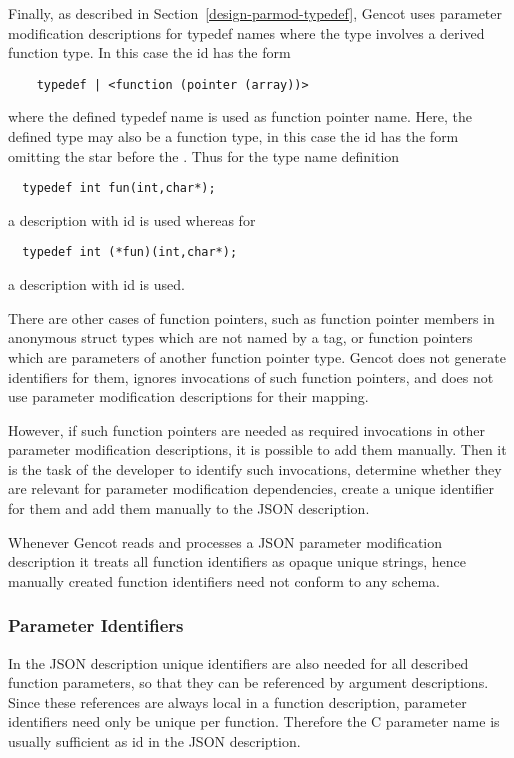 Finally, as described in Section~\ref{design-parmod-typedef}, Gencot uses parameter modification descriptions for
typedef names where the type involves a derived function type. In this case the id has the form
\begin{verbatim}
    typedef | <function (pointer (array))>
\end{verbatim}
where the defined typedef name is used as function pointer name. Here, the defined type may also be a function type,
in this case the id has the form  omitting the star before the .
Thus for the type name definition
\begin{verbatim}
  typedef int fun(int,char*);
\end{verbatim}
a description with id  is used whereas for
\begin{verbatim}
  typedef int (*fun)(int,char*);
\end{verbatim}
a description with id  is used.

There are other cases of function pointers, such as function pointer members in anonymous struct
types which are not named by a tag, or function pointers which are parameters of another function pointer type.
Gencot does not generate identifiers for them, ignores invocations of such function pointers, and does not use
parameter modification descriptions for their mapping.

However, if such function pointers are needed as required invocations in other parameter modification descriptions,
it is possible to add them manually. Then it is the task of the developer to identify such invocations,
determine whether they are relevant for parameter modification dependencies, create a unique identifier for them and
add them manually to the JSON description. 

Whenever Gencot reads and processes a JSON parameter modification description it treats all function identifiers as
opaque unique strings, hence manually created function identifiers need not conform to any schema.

\subsubsection{Parameter Identifiers}

In the JSON description unique identifiers are also needed for all described function parameters, so that they can 
be referenced by argument descriptions. Since these references are always local in a function description, parameter
identifiers need only be unique per function. Therefore the C parameter name is usually sufficient as id in the 
JSON description.


